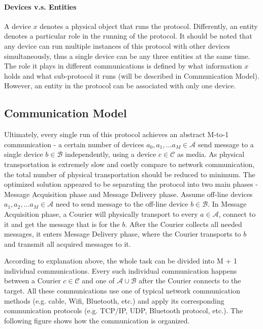 \paragraph{Devices v.s. Entities}
A device $x$ denotes a physical object that runs the protocol. Differently, an entity denotes a particular role in the running of the protocol. It should be noted that any  device can run multiple instances of this protocol with other devices simultaneously, thus a single device can be any three entities at the same time. The role it plays in different communications is defined by what information $x$ holds and what sub-protocol it runs (will be described in Communication Model). However, an entity in the protocol can be associated with only one device.

\subsection{Communication Model}
Ultimately, every single run of this protocol achieves an abstract M-to-1 communication - a certain number of devices $a_0, a_1, ... a_M \in \mathcal{A}$ send message to a single device $b \in \mathcal{B}$ independently, using a device $c \in \mathcal{C}$ as media. As physical transportation is extremely slow and costly compare to network communication, the total number of physical transportation should be reduced to minimum. The optimized solution appeared to be separating the protocol into two main phases - Message Acquisition phase and Message Delivery phase. Assume off-line devices $a_1, a_2, ... a_M \in \mathcal{A}$ need to send message to the off-line device $b \in \mathcal{B}$. In Message Acquisition phase, a Courier will physically transport to every $a \in \mathcal{A}$, connect to it and get the message that is for the $b$. After the Courier collects all needed messages, it enters Message Delivery phase, where the Courier transports to $b$ and transmit all acquired messages to it.

According to explanation above, the whole task can be divided into M + 1 individual communications. Every such individual communication happens between a Courier $c \in \mathcal{C}$ and one of $\mathcal{A} \cup \mathcal{B}$ after the Courier connects to the target. All these communications use one of typical network communication methods (e.g. cable, Wifi, Bluetooth, etc.) and apply its corresponding communication protocols (e.g. TCP/IP, UDP, Bluetooth protocol, etc.). The following figure shows how the communication is organized.

